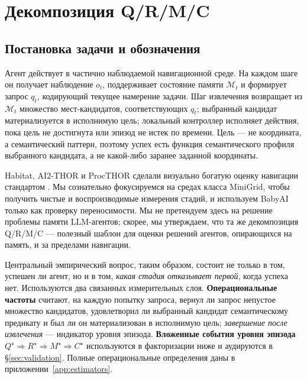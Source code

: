 \documentclass{article}
\begin{document}
\section{Декомпозиция Q/R/M/C}
\label{sec:framework}

\subsection{Постановка задачи и обозначения}
\label{sec:notation}

Агент действует в частично наблюдаемой навигационной среде.
На каждом шаге он получает наблюдение $o_t$, поддерживает состояние
памяти $\mathcal{M}_t$ и формирует запрос $q_t$, кодирующий текущее
намерение задачи. Шаг извлечения возвращает из $\mathcal{M}_t$ множество
мест-кандидатов, соответствующих $q_t$; выбранный кандидат
материализуется в исполнимую цель; локальный контроллер исполняет
действия, пока цель не достигнута или эпизод не истек по времени.
Цель --- не координата, а семантический паттерн, поэтому успех есть
функция семантического профиля выбранного кандидата, а не какой-либо
заранее заданной координаты.

Habitat, AI2-THOR и ProcTHOR сделали визуально богатую оценку навигации
стандартом
\citep{savva2019habitat,kolve2017ai2thor,deitke2022procthor}. Мы
сознательно фокусируемся на средах класса MiniGrid, чтобы получить чистые и
воспроизводимые измерения стадий, и используем BabyAI только как проверку
переносимости. Мы не претендуем здесь на решение проблемы памяти LLM-агентов; скорее, мы
утверждаем, что та же декомпозиция Q/R/M/C --- полезный шаблон для
оценки решений агентов, опирающихся на память, и за пределами навигации.

Центральный эмпирический вопрос, таким образом, состоит не только в том, успешен ли агент,
но и в том, \emph{какая стадия отказывает первой}, когда успеха нет. Используются два
связанных измерительных слоя. \textbf{Операциональные частоты} считают,
на каждую попытку запроса, вернул ли запрос непустое множество
кандидатов, удовлетворил ли выбранный кандидат семантическому предикату
и был ли он материализован в исполнимую цель;
\emph{завершение после извлечения} --- индикатор уровня эпизода.
\textbf{Вложенные события уровня эпизода}
$Q^\star \Rightarrow R^\star \Rightarrow M^\star \Rightarrow C^\star$
используются в факторизации ниже и аудируются в
\S\ref{sec:validation}. Полные операциональные определения даны в
приложении~\ref{app:estimators}.
\end{document}
